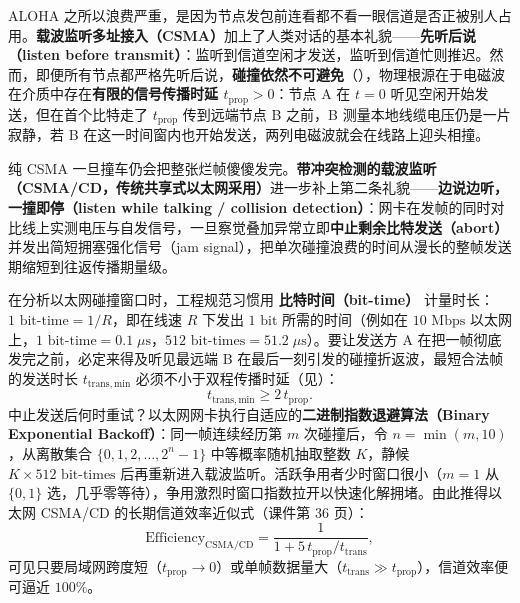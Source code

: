 
ALOHA 之所以浪费严重，是因为节点发包前连看都不看一眼信道是否正被别人占用。\textbf{载波监听多址接入（CSMA）}加上了人类对话的基本礼貌——\textbf{先听后说（listen before transmit）}：监听到信道空闲才发送，监听到信道忙则推迟。然而，即便所有节点都严格先听后说，\textbf{碰撞依然不可避免}（），物理根源在于电磁波在介质中存在\textbf{有限的信号传播时延 $t_{\mathrm{prop}} > 0$}：节点 A 在 $t=0$ 听见空闲开始发送，但在首个比特走了 $t_{\mathrm{prop}}$ 传到远端节点 B 之前，B 测量本地线缆电压仍是一片寂静，若 B 在这一时间窗内也开始发送，两列电磁波就会在线路上迎头相撞。

纯 CSMA 一旦撞车仍会把整张烂帧傻傻发完。\textbf{带冲突检测的载波监听（CSMA/CD，传统共享式以太网采用）}进一步补上第二条礼貌——\textbf{边说边听，一撞即停（listen while talking / collision detection）}：网卡在发帧的同时对比线上实测电压与自发信号，一旦察觉叠加异常立即\textbf{中止剩余比特发送（abort）}并发出简短拥塞强化信号（jam signal），把单次碰撞浪费的时间从漫长的整帧发送期缩短到往返传播期量级。

在分析以太网碰撞窗口时，工程规范习惯用 \textbf{比特时间（bit-time）} 计量时长：$1\text{ bit-time} = 1/R$，即在线速 $R$ 下发出 $1\text{ bit}$ 所需的时间（例如在 $10\text{ Mbps}$ 以太网上，$1\text{ bit-time} = 0.1\;\mu\text{s}$，$512\text{ bit-times} = 51.2\;\mu\text{s}$）。要让发送方 A 在把一帧彻底发完之前，必定来得及听见最远端 B 在最后一刻引发的碰撞折返波，最短合法帧的发送时长 $t_{\mathrm{trans,min}}$ 必须不小于双程传播时延（见）：
\[
t_{\mathrm{trans,min}} \ge 2\, t_{\mathrm{prop}}.
\tag{6.4}
\]
中止发送后何时重试？以太网网卡执行自适应的\textbf{二进制指数退避算法（Binary Exponential Backoff）}：同一帧连续经历第 $m$ 次碰撞后，令 $n = \min(m, 10)$，从离散集合 $\{0, 1, 2, \dots, 2^n - 1\}$ 中等概率随机抽取整数 $K$，静候 $K \times 512\text{ bit-times}$ 后再重新进入载波监听。活跃争用者少时窗口很小（$m=1$ 从 $\{0,1\}$ 选，几乎零等待），争用激烈时窗口指数拉开以快速化解拥堵。由此推得以太网 CSMA/CD 的长期信道效率近似式（课件第 36 页）：
\[
\mathrm{Efficiency}_{\mathrm{CSMA/CD}} = \frac{1}{1 + 5\, t_{\mathrm{prop}} / t_{\mathrm{trans}}},
\tag{6.5}
\]
可见只要局域网跨度短（$t_{\mathrm{prop}} \to 0$）或单帧数据量大（$t_{\mathrm{trans}} \gg t_{\mathrm{prop}}$），信道效率便可逼近 $100\%$。



